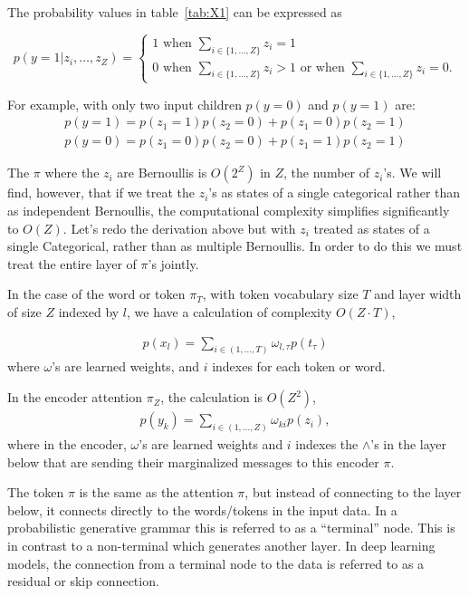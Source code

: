 \documentclass{article}
\begin{document}
The probability values in table~\ref{tab:X1} can be expressed as 

\begin{equation}
    p(y=1|z_i, \ldots, z_Z) = 
    \begin{cases}
        1 \text{ when } \sum_{i \in \{1, \ldots, Z\}} z_i = 1 \\
        0 \text{ when } \sum_{i \in \{1, \ldots, Z\}} z_i > 1 \text{ or when }  \sum_{i \in \{1, \ldots, Z\}} z_i = 0.
    \end{cases}
\end{equation}


For example, with only two input children $p(y=0)$ and $p(y=1)$ are:
\begin{eqnarray}
    p(y=1) = p(z_1 = 1)p(z_2=0) + p(z_1 = 0)p(z_2=1) \nonumber \\
    p(y=0) = p(z_1 = 0)p(z_2=0) + p(z_1 = 1)p(z_2=1)
\end{eqnarray}

The $\pi$ where the $z_i$ are Bernoullis is $O(2^Z)$ in $Z$, the number of $z_i$'s.  We will find, however, that if we treat the $z_i$'s as states of a single categorical rather than as independent Bernoullis, the computational complexity simplifies significantly to $O(Z)$.  Let's redo the derivation above but with $z_i$ treated as states of a single Categorical, rather than as multiple Bernoullis.  In order to do this we must treat the entire layer of $\pi$'s jointly. 

In the case of the word or token $\pi_T$, with token vocabulary size $T$ and layer width of size $Z$ indexed by $l$, we have a calculation of complexity $O(Z \cdot T)$,

\begin{eqnarray}
    p(x_l) = \sum_{i \in (1, \dots, T)} \omega_{l,\tau} p(t_\tau)
\end{eqnarray}
where $\omega$'s are learned weights, and $i$ indexes for each token or word. 

In the encoder attention $\pi_Z$, the calculation is $O(Z^2)$,
\begin{eqnarray}
    p(y_k) = \sum_{i \in (1, \dots, Z)} \omega_{ki} p(z_i),
\end{eqnarray}
where in the encoder, $\omega$'s are learned weights and $i$ indexes the $\land$'s in the layer below that are sending their marginalized messages to this encoder $\pi$. 

The token $\pi$ is the same as the attention $\pi$, but instead of connecting to the layer below, it connects directly to the words/tokens in the input data.  In a probabilistic generative grammar this is referred to as a ``terminal'' node. This is in contrast to a non-terminal which generates another layer. In deep learning models, the connection from a terminal node to the data is referred to as a residual or skip connection.
\end{document}
